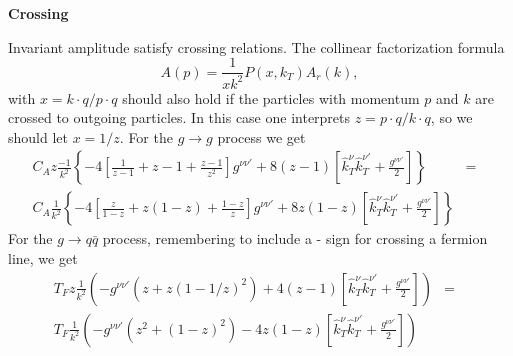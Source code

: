 \documentclass{letter}
\newcommand{\section}[1]{\medskip\bigskip

\noindent\textbf{\LARGE #1}}
\begin{document}
\section{Crossing}

Invariant amplitude satisfy crossing relations. The collinear factorization
formula
\begin{equation}
  A (p) = \frac{1}{x k^2} P (x, k_T) A_r (k),
\end{equation}
with $x = k \cdot q / p \cdot q$ should also hold if the particles with
momentum $p$ and $k$ are crossed to outgoing particles. In this case one
interprets $z = p \cdot q / k \cdot q$, so we should let $x = 1 / z$. For the
$g \rightarrow g$ process we get
\begin{eqnarray}
  C_A z \frac{- 1}{k^2}  \left\{ - 4 \left[ \frac{1}{z - 1} + z - 1 + \frac{z
  - 1}{z^2} \right] g^{\nu \nu'} + 8 (z - 1) \left[ \hat{k}_T^{\nu} 
  \hat{k}_T^{\nu'} + \frac{g^{\nu \nu'}}{2} \right] \right\} & = & 
  \nonumber\\
  C_A  \frac{1}{k^2}  \left\{ - 4 \left[ \frac{z}{1 - z} + z (1 - z) + \frac{1
  - z}{z} \right] g^{\nu \nu'} + 8 z (1 - z) \left[ \hat{k}_T^{\nu} 
  \hat{k}_T^{\nu'} + \frac{g^{\nu \nu'}}{2} \right] \right\} &  & 
\end{eqnarray}
For the $g \rightarrow q \bar{q}$ process, remembering to include a - sign for
crossing a fermion line, we get
\begin{eqnarray*}
  T_F z \frac{1}{k^2} \left( - g^{\nu \nu'} (z + z (1 - 1 / z)^2) + 4 (z - 1)
  \left[ \hat{k}_T^{\nu}  \hat{k}_T^{\nu'} + \frac{g^{\nu \nu'}}{2} \right]
  \right) & = & \\
  T_F  \frac{1}{k^2} \left( - g^{\nu \nu'} \left( z^2 + (1 - z)^2 \right) - 4
  z (1 - z) \left[ \hat{k}_T^{\nu}  \hat{k}_T^{\nu'} + \frac{g^{\nu \nu'}}{2}
  \right] \right) &  & 
\end{eqnarray*}
\end{document}
